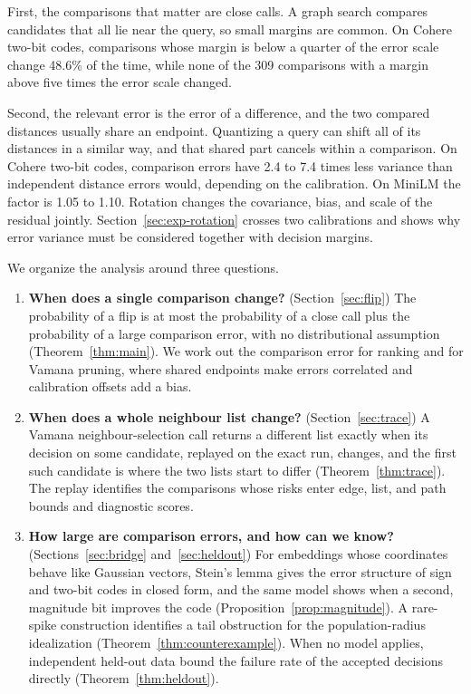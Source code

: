 \documentclass[twoside,11pt]{article}
\begin{document}
First, the comparisons that matter are close calls. A graph search compares candidates that all lie near the query, so small margins are common. On Cohere two-bit codes, comparisons whose margin is below a quarter of the error scale change 48.6\% of the time, while none of the 309 comparisons with a margin above five times the error scale changed.

Second, the relevant error is the error of a difference, and the two compared distances usually share an endpoint. Quantizing a query can shift all of its distances in a similar way, and that shared part cancels within a comparison. On Cohere two-bit codes, comparison errors have 2.4 to 7.4 times less variance than independent distance errors would, depending on the calibration. On MiniLM the factor is 1.05 to 1.10. Rotation changes the covariance, bias, and scale of the residual jointly. Section~\ref{sec:exp-rotation} crosses two calibrations and shows why error variance must be considered together with decision margins.

We organize the analysis around three questions.
\begin{enumerate}
\setlength{\itemsep}{2pt}
\setlength{\parsep}{0pt}
\item \textbf{When does a single comparison change?} (Section~\ref{sec:flip}) The probability of a flip is at most the probability of a close call plus the probability of a large comparison error, with no distributional assumption (Theorem~\ref{thm:main}). We work out the comparison error for ranking and for Vamana pruning, where shared endpoints make errors correlated and calibration offsets add a bias.
\item \textbf{When does a whole neighbour list change?} (Section~\ref{sec:trace}) A Vamana neighbour-selection call returns a different list exactly when its decision on some candidate, replayed on the exact run, changes, and the first such candidate is where the two lists start to differ (Theorem~\ref{thm:trace}). The replay identifies the comparisons whose risks enter edge, list, and path bounds and diagnostic scores.
\item \textbf{How large are comparison errors, and how can we know?} (Sections~\ref{sec:bridge} and~\ref{sec:heldout}) For embeddings whose coordinates behave like Gaussian vectors, Stein's lemma gives the error structure of sign and two-bit codes in closed form, and the same model shows when a second, magnitude bit improves the code (Proposition~\ref{prop:magnitude}). A rare-spike construction identifies a tail obstruction for the population-radius idealization (Theorem~\ref{thm:counterexample}). When no model applies, independent held-out data bound the failure rate of the accepted decisions directly (Theorem~\ref{thm:heldout}).
\end{enumerate}
\end{document}
